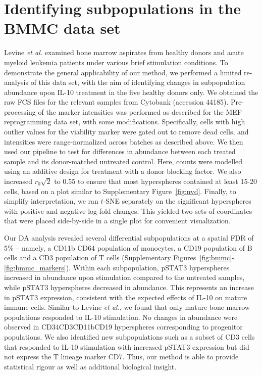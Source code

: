 \documentclass{article}
\begin{document}
\section{Identifying subpopulations in the BMMC data set}
\label{sec:bmmc}
Levine \textit{et al.} \cite{levine2015datadriven} examined bone marrow aspirates from healthy donors and acute myeloid leukemia patients under various brief stimulation conditions.
To demonstrate the general applicability of our method, we performed a limited re-analysis of this data set, with the aim of identifying changes in subpopulation abundance upon IL-10 treatment in the five healthy donors only.
We obtained the raw FCS files for the relevant samples from Cytobank (accession 44185).
Pre-processing of the marker intensities was performed as described for the MEF reprogramming data set, with some modifications.
Specifically, cells with high outlier values for the viability marker were gated out to remove dead cells, and intensities were range-normalized across batches as described above.
We then used our pipeline to test for differences in abundance between each treated sample and its donor-matched untreated control.
Here, counts were modelled using an additive design for treatment with a donor blocking factor.
We also increased $r_0\sqrt{2}$ to 0.55 to ensure that most hyperspheres contained at least 15-20 cells, based on a plot similar to Supplementary Figure~\ref{fig:nvd}.
Finally, to simplify interpretation, we ran $t$-SNE separately on the significant hyperspheres with positive and negative log-fold changes.
This yielded two sets of coordinates that were placed side-by-side in a single plot for convenient visualization.

Our DA analysis revealed several differential subpopulations at a spatial FDR of 5\% -- namely, a CD11b\hi{} CD64\hi{} population of monocytes, a CD19\hi{} population of B cells and a CD3\hi{} population of T cells (Supplementary Figures~\ref{fig:bmmc}-\ref{fig:bmmc_markers}).
Within each subpopulation, pSTAT3\hi{} hyperspheres increased in abundance upon stimulation compared to the untreated samples, while pSTAT3\lo{} hyperspheres decreased in abundance.
This represents an increase in pSTAT3 expression, consistent with the expected effects of IL-10 on mature immune cells.
Similar to Levine \textit{et al.}, we found that only mature bone marrow populations responded to IL-10 stimulation.
No changes in abundance were observed in CD34\hi{}CD3\lo{}CD11b\lo{}CD19\lo{} hyperspheres corresponding to progenitor populations.
We also identified new subpopulations such as a subset of CD3\hi{} cells that responded to IL-10 stimulation with increased pSTAT3 expression but did not express the T lineage marker CD7.
Thus, our method is able to provide statistical rigour as well as additional biological insight.
\end{document}
